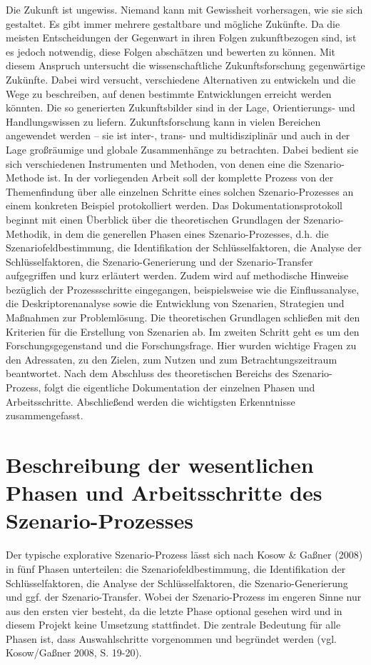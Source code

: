 \documentclass[12pt,a4paper]{article}
\begin{document}
Die Zukunft ist ungewiss. Niemand kann mit Gewissheit vorhersagen, wie sie sich gestaltet. Es gibt immer mehrere gestaltbare und mögliche Zukünfte. Da die meisten Entscheidungen der Gegenwart in ihren Folgen zukunftbezogen sind, ist es jedoch notwendig, diese Folgen abschätzen und bewerten zu können. Mit diesem Anspruch untersucht die wissenschaftliche Zukunftsforschung gegenwärtige Zukünfte. Dabei wird versucht, verschiedene Alternativen zu entwickeln und die Wege zu beschreiben, auf denen bestimmte Entwicklungen erreicht werden könnten. Die so generierten Zukunftsbilder sind in der Lage, Orientierungs- und Handlungswissen zu liefern. Zukunftsforschung kann in vielen Bereichen angewendet werden – sie ist inter-, trans- und multidisziplinär und auch in der Lage großräumige und globale Zusammenhänge zu betrachten. Dabei bedient sie sich verschiedenen Instrumenten und Methoden, von denen eine die Szenario-Methode ist.
In der vorliegenden Arbeit soll der komplette Prozess von der Themenfindung über alle einzelnen Schritte eines solchen Szenario-Prozesses an einem konkreten Beispiel protokolliert werden. Das Dokumentationsprotokoll beginnt mit einen Überblick über die theoretischen Grundlagen der Szenario-Methodik, in dem die generellen Phasen eines Szenario-Prozesses, d.h. die Szenariofeldbestimmung, die Identifikation der Schlüsselfaktoren, die Analyse der Schlüsselfaktoren, die Szenario-Generierung und der Szenario-Transfer aufgegriffen und kurz erläutert werden. Zudem wird   auf methodische Hinweise bezüglich der Prozessschritte eingegangen, beispielsweise wie die Einflussanalyse, die Deskriptorenanalyse sowie die Entwicklung von Szenarien, Strategien und Maßnahmen zur Problemlösung. Die theoretischen Grundlagen schließen mit den Kriterien für die Erstellung von Szenarien ab. Im zweiten Schritt geht es um den Forschungsgegenstand und die Forschungsfrage. Hier wurden wichtige Fragen zu den Adressaten, zu den Zielen, zum Nutzen und zum Betrachtungszeitraum beantwortet. Nach dem Abschluss des theoretischen Bereichs des Szenario-Prozess, folgt die eigentliche Dokumentation der einzelnen Phasen und Arbeitsschritte. Abschließend werden die wichtigsten Erkenntnisse zusammengefasst.

\section{Beschreibung der wesentlichen Phasen und Arbeitsschritte des Szenario-Prozesses}
Der typische explorative Szenario-Prozess lässt sich nach Kosow \& Gaßner (2008) \cite{Kosow2008} in fünf Phasen unterteilen: die Szenariofeldbestimmung, die Identifikation der Schlüsselfaktoren, die Analyse der Schlüsselfaktoren, die Szenario-Generierung und ggf. der Szenario-Transfer. Wobei der Szenario-Prozess im engeren Sinne nur aus den ersten vier besteht, da die letzte Phase optional gesehen wird und in diesem Projekt keine Umsetzung stattfindet. Die zentrale Bedeutung für alle Phasen ist, dass Auswahlschritte vorgenommen und begründet werden (vgl. Kosow/Gaßner 2008, S. 19-20).
\end{document}
